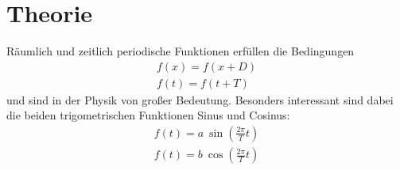 

\section{Theorie}
\setcounter{page}{1}
Räumlich und zeitlich periodische Funktionen erfüllen die Bedingungen
\begin{align*}
f(x)=f(x+D)\\
f(t)=f(t+T)
\end{align*}
und sind in der Physik von großer Bedeutung. Besonders interessant sind dabei die beiden trigometrischen Funktionen Sinus und Cosinus:
\begin{align*}
f(t)=a~ \sin \left(\frac{2\pi}{T}t\right)\\
f(t)=b~ \cos \left(\frac{2\pi}{T}t\right)
\end{align*}

